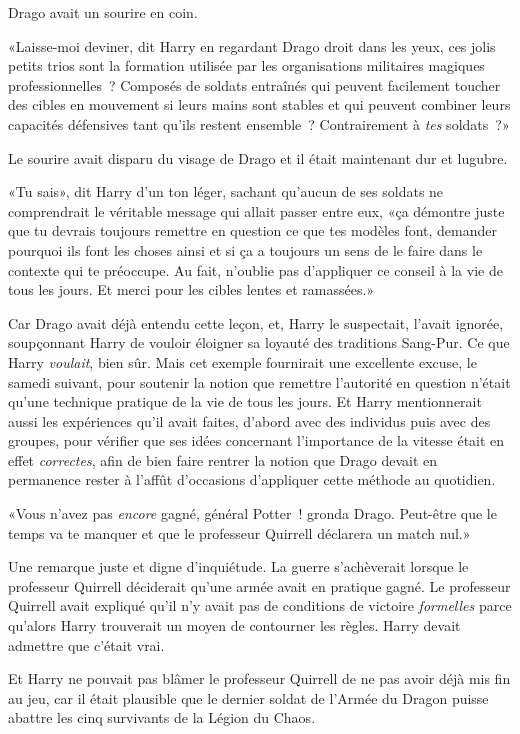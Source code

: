 Drago avait un sourire en coin.

«Laisse-moi deviner, dit Harry en regardant Drago droit dans les yeux, ces jolis petits trios sont la formation utilisée par les organisations militaires magiques professionnelles~? Composés de soldats entraînés qui peuvent facilement toucher des cibles en mouvement si leurs mains sont stables et qui peuvent combiner leurs capacités défensives tant qu'ils restent ensemble~? Contrairement à \emph{tes} soldats~?»

Le sourire avait disparu du visage de Drago et il était maintenant dur et lugubre.

«Tu sais», dit Harry d'un ton léger, sachant qu'aucun de ses soldats ne comprendrait le véritable message qui allait passer entre eux, «ça démontre juste que tu devrais toujours remettre en question ce que tes modèles font, demander pourquoi ils font les choses ainsi et si ça a toujours un sens de le faire dans le contexte qui te préoccupe. Au fait, n'oublie pas d'appliquer ce conseil à la vie de tous les jours. Et merci pour les cibles lentes et ramassées.»

Car Drago avait déjà entendu cette leçon, et, Harry le suspectait, l'avait ignorée, soupçonnant Harry de vouloir éloigner sa loyauté des traditions Sang-Pur. Ce que Harry \emph{voulait}, bien sûr. Mais cet exemple fournirait une excellente excuse, le samedi suivant, pour soutenir la notion que remettre l'autorité en question n'était qu'une technique pratique de la vie de tous les jours. Et Harry mentionnerait aussi les expériences qu'il avait faites, d'abord avec des individus puis avec des groupes, pour vérifier que ses idées concernant l'importance de la vitesse était en effet \emph{correctes}, afin de bien faire rentrer la notion que Drago devait en permanence rester à l'affût d'occasions d'appliquer cette méthode au quotidien.

«Vous n'avez pas \emph{encore} gagné, général Potter~! gronda Drago. Peut-être que le temps va te manquer et que le professeur Quirrell déclarera un match nul.»

Une remarque juste et digne d'inquiétude. La guerre s'achèverait lorsque le professeur Quirrell déciderait qu'une armée avait en pratique gagné. Le professeur Quirrell avait expliqué qu'il n'y avait pas de conditions de victoire \emph{formelles} parce qu'alors Harry trouverait un moyen de contourner les règles. Harry devait admettre que c'était vrai.

Et Harry ne pouvait pas blâmer le professeur Quirrell de ne pas avoir déjà mis fin au jeu, car il était plausible que le dernier soldat de l'Armée du Dragon puisse abattre les cinq survivants de la Légion du Chaos.

